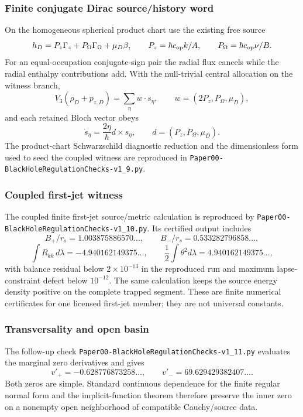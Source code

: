 \documentclass[12pt,a4paper]{article}
\begin{document}
\subsubsection{Finite conjugate Dirac source/history word}
On the homogeneous spherical product chart use the existing free source
\[
 h_D=P_z\Gamma_z+P_\Omega\Gamma_\Omega+\mu_D\beta,
 \qquad P_z=\hbar c_{\rm op}k/A,
 \qquad P_\Omega=\hbar c_{\rm op}\nu/B.
\]
For an equal-occupation conjugate-sign pair the radial flux cancels while the
radial enthalpy contributions add.  With the null-trivial central allocation
on the witness branch,
\[
 V_3(\rho_D+p_{z,D})=\sum_\eta w\cdot s_\eta,
 \qquad w=(2P_z,P_\Omega,\mu_D),
\]
and each retained Bloch vector obeys
\[
 \dot s_\eta=\frac{2\eta}{\hbar}d\times s_\eta,
 \qquad d=(P_z,P_\Omega,\mu_D).
\]
The product-chart Schwarzschild diagnostic reduction and the dimensionless
form used to seed the coupled witness are reproduced in
\texttt{Paper00-\allowbreak BlackHole\allowbreak Regulation\allowbreak Checks-v1\_9.py}.

\subsubsection{Coupled first-jet witness}
The coupled finite first-jet source/metric calculation is reproduced by
\texttt{Paper00-\allowbreak BlackHole\allowbreak Regulation\allowbreak Checks-v1\_10.py}.  Its certified output
includes
\[
 B_+/r_s=1.003875886570\ldots,
 \qquad B_-/r_s=0.533282796858\ldots,
\]
\[
 \int R_{kk}\,d\lambda=-4.940162149375\ldots,
 \qquad
 \frac12\int\theta^2d\lambda=4.940162149375\ldots,
\]
with balance residual below \(2\times10^{-13}\) in the reproduced run and
maximum lapse-constraint defect below \(10^{-12}\).  The same calculation
keeps the source energy density positive on the complete trapped segment.
These are finite numerical certificates for one licensed first-jet member;
they are not universal constants.

\subsubsection{Transversality and open basin}
The follow-up check
\texttt{Paper00-BlackHoleRegulationChecks-v1\_11.py} evaluates the marginal
zero derivatives and gives
\[
 v'_+=-0.628776873258\ldots,
 \qquad v'_-=69.629429382407\ldots.
\]
Both zeros are simple.  Standard continuous dependence for the finite regular
normal form and the implicit-function theorem therefore preserve the inner
zero on a nonempty open neighborhood of compatible Cauchy/source data.
\end{document}
